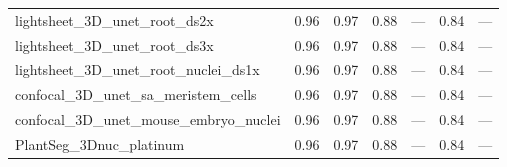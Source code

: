 \documentclass[./dissertation.tex]{subfiles}
\begin{document}
\begin{table}[htbp]
\begin{tabular}{|l|c|c|c|c|c|c|}
        lightsheet\_3D\_unet\_root\_ds2x          & 0.96                                    & 0.97                                        & 0.88                                    & ---                                   & 0.84                                   & ---                                     \\
        lightsheet\_3D\_unet\_root\_ds3x          & 0.96                                    & 0.97                                        & 0.88                                    & ---                                   & 0.84                                   & ---                                     \\
        lightsheet\_3D\_unet\_root\_nuclei\_ds1x  & 0.96                                    & 0.97                                        & 0.88                                    & ---                                   & 0.84                                   & ---                                     \\
        confocal\_3D\_unet\_sa\_meristem\_cells   & 0.96                                    & 0.97                                        & 0.88                                    & ---                                   & 0.84                                   & ---                                     \\
        confocal\_3D\_unet\_mouse\_embryo\_nuclei & 0.96                                    & 0.97                                        & 0.88                                    & ---                                   & 0.84                                   & ---                                     \\
        PlantSeg\_3Dnuc\_platinum                 & 0.96                                    & 0.97                                        & 0.88                                    & ---                                   & 0.84                                   & ---                                     \\
        \bottomrule
    \end{tabular}
\end{table}



\end{document}
